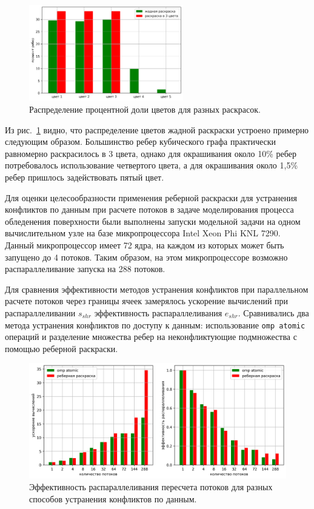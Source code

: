 \begin{figure}[ht]
\centering
\includegraphics[width=0.6\textwidth]{./pics/text_3_edge_coloring/10-chart.png}
\singlespacing
{}\caption{Распределение процентной доли цветов для разных раскрасок.}
\label{fig:text_3_edge_coloring_10}
\end{figure}

Из рис.~\ref{fig:text_3_edge_coloring_10} видно, что распределение цветов жадной раскраски устроено примерно следующим образом.
Большинство ребер кубического графа практически равномерно раскрасилось в 3 цвета, однако для окрашивания около 10\% ребер потребовалось использование четвертого цвета, а для окрашивания около 1,5\% ребер пришлось задействовать пятый цвет.

Для оценки целесообразности применения реберной раскраски для устранения конфликтов по данным при расчете потоков в задаче моделирования процесса обледенения поверхности были выполнены запуски модельной задачи на одном вычислительном узле на базе микропроцессора Intel Xeon Phi KNL\label{abbr:knl2} 7290.
Данный микропроцессор имеет 72 ядра, на каждом из которых может быть запущено до 4 потоков.
Таким образом, на этом микропроцессоре возможно распараллеливание запуска на 288 потоков.

Для сравнения эффективности методов устранения конфликтов при параллельном расчете потоков через границы ячеек замерялось ускорение вычислений при распараллеливании $s_{shr}$ эффективность распараллеливания $e_{shr}$.
Сравнивались два метода устранения конфликтов по доступу к данным: использование \texttt{omp atomic} операций и разделение множества ребер на неконфликтующие подмножества с помощью реберной раскраски.

\begin{figure}[ht]
\centering
\includegraphics[width=1.0\textwidth]{./pics/text_3_edge_coloring/11-chart.png}
\singlespacing
{}\caption{Эффективность распараллеливания пересчета потоков для разных способов устранения конфликтов по данным.}
\label{fig:text_3_edge_coloring_11}
\end{figure}

